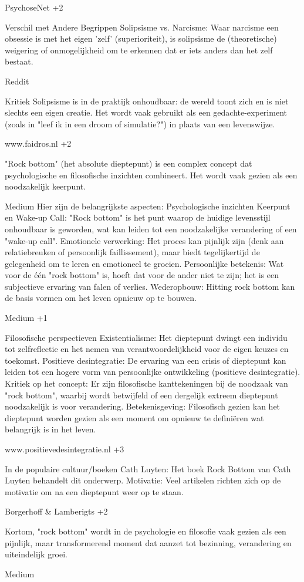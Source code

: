 PsychoseNet +2

Verschil met Andere Begrippen
Solipsisme vs. Narcisme: Waar narcisme een obsessie is met het eigen 'zelf' (superioriteit), is solipsisme de (theoretische) weigering of onmogelijkheid om te erkennen dat er iets anders dan het zelf bestaat.

Reddit

Kritiek
Solipsisme is in de praktijk onhoudbaar: de wereld toont zich en is niet slechts een eigen creatie.
Het wordt vaak gebruikt als een gedachte-experiment (zoals in "leef ik in een droom of simulatie?") in plaats van een levenswijze.

www.faidros.nl +2

"Rock bottom" (het absolute dieptepunt) is een complex concept dat psychologische en filosofische inzichten combineert. Het wordt vaak gezien als een noodzakelijk keerpunt.

Medium
Hier zijn de belangrijkste aspecten:
Psychologische inzichten
Keerpunt en Wake-up Call: "Rock bottom" is het punt waarop de huidige levensstijl onhoudbaar is geworden, wat kan leiden tot een noodzakelijke verandering of een "wake-up call".
Emotionele verwerking: Het proces kan pijnlijk zijn (denk aan relatiebreuken of persoonlijk faillissement), maar biedt tegelijkertijd de gelegenheid om te leren en emotioneel te groeien.
Persoonlijke betekenis: Wat voor de één "rock bottom" is, hoeft dat voor de ander niet te zijn; het is een subjectieve ervaring van falen of verlies.
Wederopbouw: Hitting rock bottom kan de basis vormen om het leven opnieuw op te bouwen.

Medium +1

Filosofische perspectieven
Existentialisme: Het dieptepunt dwingt een individu tot zelfreflectie en het nemen van verantwoordelijkheid voor de eigen keuzes en toekomst.
Positieve desintegratie: De ervaring van een crisis of dieptepunt kan leiden tot een hogere vorm van persoonlijke ontwikkeling (positieve desintegratie).
Kritiek op het concept: Er zijn filosofische kanttekeningen bij de noodzaak van "rock bottom", waarbij wordt betwijfeld of een dergelijk extreem dieptepunt noodzakelijk is voor verandering.
Betekenisgeving: Filosofisch gezien kan het dieptepunt worden gezien als een moment om opnieuw te definiëren wat belangrijk is in het leven.

www.positievedesintegratie.nl +3

In de populaire cultuur/boeken
Cath Luyten: Het boek Rock Bottom van Cath Luyten behandelt dit onderwerp.
Motivatie: Veel artikelen richten zich op de motivatie om na een dieptepunt weer op te staan.

Borgerhoff \& Lamberigts +2

Kortom, "rock bottom" wordt in de psychologie en filosofie vaak gezien als een pijnlijk, maar transformerend moment dat aanzet tot bezinning, verandering en uiteindelijk groei.

Medium

